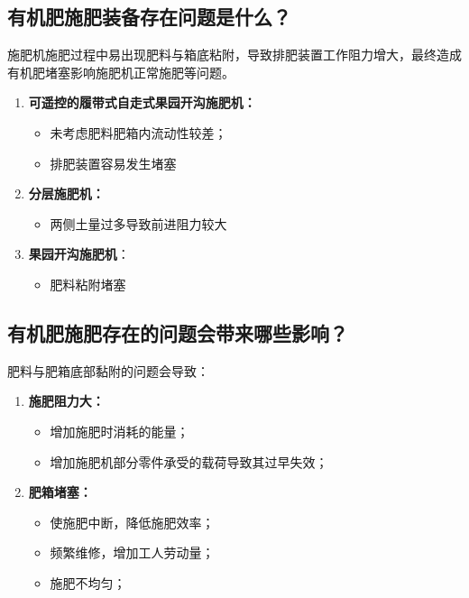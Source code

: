 \documentclass[a4paper,12pt,fontset=none,titlepage]{ctexart}
\begin{document}
\subsection{有机肥施肥装备存在问题是什么？}

施肥机施肥过程中易出现肥料与箱底粘附，导致排肥装置工作阻力增大，最终造成有机肥堵塞影响施肥机正常施肥等问题。

\begin{enumerate}
	\item \textbf{可遥控的履带式自走式果园开沟施肥机：}
	
    \begin{itemize}
		\item 未考虑肥料肥箱内流动性较差；
		\item 排肥装置容易发生堵塞
	\end{itemize}
	
	\item \textbf{分层施肥机：}
	
	\begin{itemize}
		\item 两侧土量过多导致前进阻力较大
	\end{itemize}
	
	\item \textbf{果园开沟施肥机}：
	
	\begin{itemize}
		\item 肥料粘附堵塞
	\end{itemize}
\end{enumerate}

\subsection{有机肥施肥存在的问题会带来哪些影响？}

肥料与肥箱底部黏附的问题会导致：

\begin{enumerate}
	\item \textbf{施肥阻力大：}

	\begin{itemize}
		\item 增加施肥时消耗的能量；
		\item 增加施肥机部分零件承受的载荷导致其过早失效；
	\end{itemize}
	
	\item \textbf{肥箱堵塞：}
	
	\begin{itemize}
		\item 使施肥中断，降低施肥效率；
		\item 频繁维修，增加工人劳动量；
		\item 施肥不均匀；
	\end{itemize}
\end{enumerate}
\end{document}
